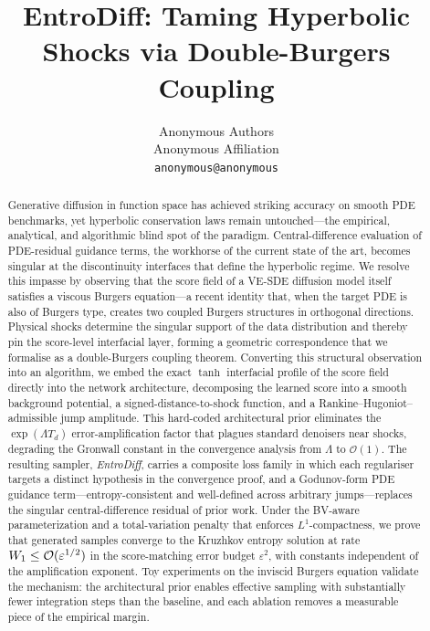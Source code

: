 \documentclass{article}
\title{EntroDiff: Taming Hyperbolic Shocks via Double-Burgers Coupling}
\author{%
  Anonymous Authors\\
  Anonymous Affiliation\\
  \texttt{anonymous@anonymous}\\
}
\theoremstyle{definition}
\theoremstyle{remark}
\begin{document}
\maketitle

\begin{abstract}
Generative diffusion in function space has achieved striking accuracy on smooth {PDE} benchmarks, yet hyperbolic conservation laws remain untouched---the empirical, analytical, and algorithmic blind spot of the paradigm. Central-difference evaluation of {PDE}-residual guidance terms, the workhorse of the current state of the art, becomes singular at the discontinuity interfaces that define the hyperbolic regime.
We resolve this impasse by observing that the score field of a {VE-SDE} diffusion model itself satisfies a viscous Burgers equation---a recent identity that, when the target {PDE} is also of Burgers type, creates two coupled Burgers structures in orthogonal directions. Physical shocks determine the singular support of the data distribution and thereby pin the score-level interfacial layer, forming a geometric correspondence that we formalise as a double-Burgers coupling theorem.
Converting this structural observation into an algorithm, we embed the exact $\tanh$ interfacial profile of the score field directly into the network architecture, decomposing the learned score into a smooth background potential, a signed-distance-to-shock function, and a Rankine--Hugoniot--admissible jump amplitude. This hard-coded architectural prior eliminates the $\exp(\Lambda T_{d})$ error-amplification factor that plagues standard denoisers near shocks, degrading the Gronwall constant in the convergence analysis from $\Lambda$ to $\mathcal{O}(1)$.
The resulting sampler, \emph{EntroDiff}, carries a composite loss family in which each regulariser targets a distinct hypothesis in the convergence proof, and a Godunov-form {PDE} guidance term---entropy-consistent and well-defined across arbitrary jumps---replaces the singular central-difference residual of prior work. Under the BV-aware parameterization and a total-variation penalty that enforces $L^{1}$-compactness, we prove that generated samples converge to the Kruzhkov entropy solution at rate $W_{1}\le\mathcal{O}(\varepsilon^{1/2})$ in the score-matching error budget $\varepsilon^{2}$, with constants independent of the amplification exponent. Toy experiments on the inviscid Burgers equation validate the mechanism: the architectural prior enables effective sampling with substantially fewer integration steps than the baseline, and each ablation removes a measurable piece of the empirical margin.
\end{abstract}
\end{document}
